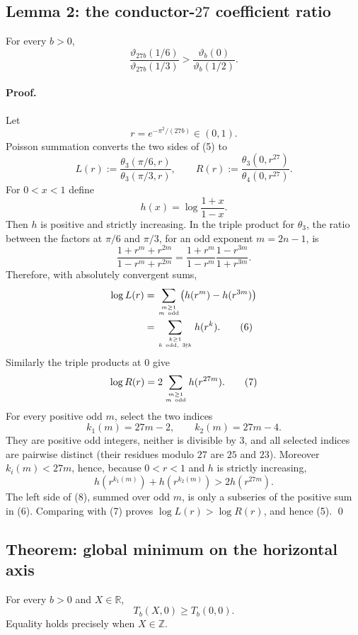 \subsection*{Lemma 2: the conductor-$27$ coefficient ratio}
For every $b>0$,
\[
 \boxed{
 \frac{\vartheta_{27b}(1/6)}{\vartheta_{27b}(1/3)}
 >\frac{\vartheta_b(0)}{\vartheta_b(1/2)}.}\tag{5}
\]

\paragraph{Proof.}
Let
\[
 r=e^{-\pi^2/(27b)}\in(0,1).
\]
Poisson summation converts the two sides of (5) to
\[
 L(r):=\frac{\theta_3(\pi/6,r)}{\theta_3(\pi/3,r)},\qquad
 R(r):=\frac{\theta_3(0,r^{27})}{\theta_4(0,r^{27})}.
\]
For $0<x<1$ define
\[
 h(x)=\log\frac{1+x}{1-x}.
\]
Then $h$ is positive and strictly increasing.  In the triple product for
$\theta_3$, the ratio between the factors at $\pi/6$ and $\pi/3$, for an odd
exponent $m=2n-1$, is
\[
 \frac{1+r^m+r^{2m}}{1-r^m+r^{2m}}
 =\frac{1+r^m}{1-r^m}\frac{1-r^{3m}}{1+r^{3m}}.
\]
Therefore, with absolutely convergent sums,
\[
 \begin{aligned}
 \log L(r)
 &=\sum_{m\ge1\atop m\ {\rm odd}}
   \bigl(h(r^m)-h(r^{3m})\bigr)\\
 &=\sum_{k\ge1\atop k\ {\rm odd},\ 3\nmid k}h(r^k).\tag{6}
 \end{aligned}
\]
Similarly the triple products at $0$ give
\[
 \log R(r)=2\sum_{m\ge1\atop m\ {\rm odd}}h(r^{27m}).\tag{7}
\]
For every positive odd $m$, select the two indices
\[
 k_1(m)=27m-2,\qquad k_2(m)=27m-4.
\]
They are positive odd integers, neither is divisible by $3$, and all selected
indices are pairwise distinct (their residues modulo $27$ are $25$ and $23$).
Moreover $k_i(m)<27m$, hence, because $0<r<1$ and $h$ is strictly increasing,
\[
 h(r^{k_1(m)})+h(r^{k_2(m)})
 >2h(r^{27m}).\tag{8}
\]
The left side of (8), summed over odd $m$, is only a subseries of the positive
sum in (6).  Comparing with (7) proves $\log L(r)>\log R(r)$, and hence (5).
\qed

\subsection*{Theorem: global minimum on the horizontal axis}
For every $b>0$ and $X\in\mathbb R$,
\[
 \boxed{T_b(X,0)\ge T_b(0,0).}\tag{9}
\]
Equality holds precisely when $X\in\mathbb Z$.

